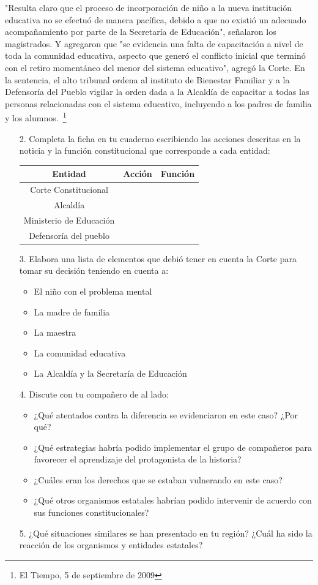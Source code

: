 \documentclass[10pt,twoside]{article}
\begin{document}
"Resulta claro que el proceso de incorporación de niño a la nueva institución educativa no se efectuó de manera pacífica, debido a que no existió un adecuado acompañamiento por parte de la Secretaría de Educación", señalaron los magistrados. Y agregaron que "se evidencia una falta de capacitación a nivel de toda la comunidad educativa, aspecto que generó el conflicto inicial que terminó con el retiro momentáneo del menor del sistema educativo", agregó la Corte. En la sentencia, el alto tribunal ordena al instituto de Bienestar Familiar y a la Defensoría del Pueblo vigilar la orden dada a la Alcaldía de capacitar a todas las personas relacionadas con el sistema educativo, incluyendo a los padres de familia y los alumnos.~\footnote{El Tiempo, 5 de septiembre de 2009}
\begin{enumerate}
\item[2.] Completa la ficha en tu cuaderno escribiendo las acciones descritas en la noticia y la función constitucional que corresponde a cada entidad:
\begin{center}
 \begin{tabular}{|c|c|c|}
\hline 
\textbf{Entidad} & \textbf{Acción} & \textbf{Función} \\ 
\hline 
Corte Constitucional &  &  \\ 
\hline 
Alcaldía &  &  \\ 
\hline 
Ministerio de Educación &  &  \\ 
\hline 
Defensoría del pueblo &  &  \\ 
\hline 
\end{tabular}
 \end{center} 
\item[3.] Elabora una lista de elementos que debió tener en cuenta la Corte para tomar su decisión teniendo en cuenta a:
\begin{itemize}
\item El niño con el problema mental
\item La madre de familia
\item La maestra
\item La comunidad educativa
\item La Alcaldía y la Secretaría de Educación
\end{itemize}
\item[4.] Discute con tu compañero de al lado:
\begin{itemize}
\item ¿Qué atentados contra la diferencia se evidenciaron en este caso? ¿Por qué?
\item ¿Qué estrategias habría podido implementar el grupo de compañeros para favorecer el aprendizaje del protagonista de la historia?
\item ¿Cuáles eran los derechos que se estaban vulnerando en este caso?
\item ¿Qué otros organismos estatales habrían podido intervenir de acuerdo con sus funciones constitucionales?
\end{itemize}
\item[5.] ¿Qué situaciones similares se han presentado en tu región? ¿Cuál ha sido la reacción de los organismos y entidades estatales?
\end{enumerate}
\end{document}
